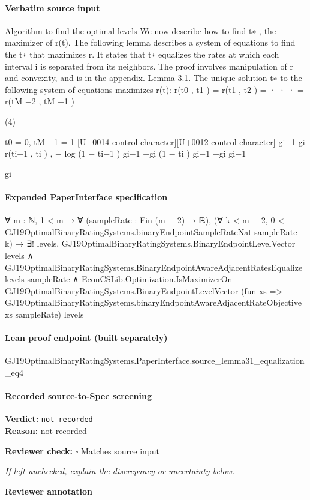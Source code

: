 \documentclass[10pt]{article}
\newcommand{\reviewerbox}{%
  \par\noindent\fbox{\parbox{0.96\linewidth}{\rule{0pt}{0.38in}}}\par
}
\newcommand{\reviewmatch}[1]{%
  \par\noindent\textbf{Reviewer check:} $\square$\; #1\par
  \noindent\emph{If left unchecked, explain the discrepancy or uncertainty below.}\par
}
\begin{document}
\paragraph{Verbatim source input}
\begin{ReviewVerbatim}
Algorithm to find the optimal levels We now
describe how to find t∗ , the maximizer of r(t).
The following lemma describes a system of equations
to find the t∗ that maximizes r. It states that t∗
equalizes the rates at which each interval i is separated from its neighbors. The proof involves manipulation of r and convexity, and is in the appendix.
Lemma 3.1. The unique solution t∗ to the following
system of equations maximizes r(t):
r(t0 , t1 ) = r(t1 , t2 ) = · · · = r(tM −2 , tM −1 )

(4)

t0 = 0, tM −1 = 1
[U+0014 control character][U+0012 control character]
gi−1
gi
r(ti−1 , ti ) , − log (1 − ti−1 ) gi−1 +gi (1 − ti ) gi−1 +gi
gi−1

gi
\end{ReviewVerbatim}


\paragraph{Expanded PaperInterface specification}
\begin{ReviewVerbatim}
∀ {m : ℕ},
  1 < m →
    ∀ (sampleRate : Fin (m + 2) → ℝ),
      (∀ k < m + 2, 0 < GJ19OptimalBinaryRatingSystems.binaryEndpointSampleRateNat sampleRate k) →
        ∃! levels,
          GJ19OptimalBinaryRatingSystems.BinaryEndpointLevelVector levels ∧
            GJ19OptimalBinaryRatingSystems.BinaryEndpointAwareAdjacentRatesEqualize levels sampleRate ∧
              EconCSLib.Optimization.IsMaximizerOn GJ19OptimalBinaryRatingSystems.BinaryEndpointLevelVector
                (fun xs => GJ19OptimalBinaryRatingSystems.binaryEndpointAwareAdjacentRateObjective xs sampleRate) levels
\end{ReviewVerbatim}

\paragraph{Lean proof endpoint (built separately)}\begin{ReviewVerbatim}
GJ19OptimalBinaryRatingSystems.PaperInterface.source_lemma31_equalization_eq4
\end{ReviewVerbatim}

\paragraph{Recorded source-to-Spec screening}
\textbf{Verdict:} \texttt{not recorded}
\\
\textbf{Reason:} not recorded
\reviewmatch{Matches source input}
\noindent\textbf{Reviewer annotation}\par
\reviewerbox
\clearpage
\hypertarget{source-claim-e679d8fd634fddb9}{}
\end{document}
